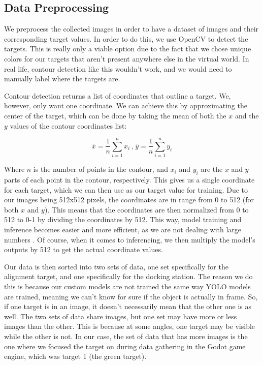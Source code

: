 \subsection{Data Preprocessing}
We preprocess the collected images in order to have a dataset of images and their corresponding target values. In order to do this, we use OpenCV to detect the targets. This is really only a viable option due to the fact that we chose unique colors for our targets that aren't present anywhere else in the virtual world. In real life, contour detection like this wouldn't work, and we would need to manually label where the targets are.

Contour detection returns a list of coordinates that outline a target. We, however, only want one coordinate. We can achieve this by approximating the center of the target, which can be done by taking the mean of both the \(x\) and the \(y\) values of the contour coordinates list:

\[
	\bar{x} = \frac{1}{n}\sum_{i=1}^{n} x_i ~\text{,} ~\bar{y} = \frac{1}{n}\sum_{i=1}^{n} y_i
\]


Where \(n\) is the number of points in the contour, and \(x_i\) and \(y_i\) are the \(x\) and \(y\) parts of each point in the contour, respectively. This gives us a single coordinate for each target, which we can then use as our target value for training. Due to our images being 512x512 pixels, the coordinates are in range from 0 to 512 (for both \(x\) and \(y\)). This means that the coordinates are then normalized from 0 to 512 to 0-1 by dividing the coordinates by 512. This way, model training and inference becomes easier and more efficient, as we are not dealing with large numbers \citep{SINGH2020105524}. Of course, when it comes to inferencing, we then multiply the model's outputs by 512 to get the actual coordinate values. 

Our data is then sorted into two sets of data, one set specifically for the alignment target, and one specifically for the docking station. The reason we do this is because our custom models are not trained the same way YOLO models are trained, meaning we can't know for sure if the object is actually in frame. So, if one target is in an image, it doesn't necessarily mean that the other one is as well. The two sets of data share images, but one set may have more or less images than the other. This is because at some angles, one target may be visible while the other is not. In our case, the set of data that has more images is the one where we focused the target on during data gathering in the Godot game engine, which was target 1 (the green target). 


